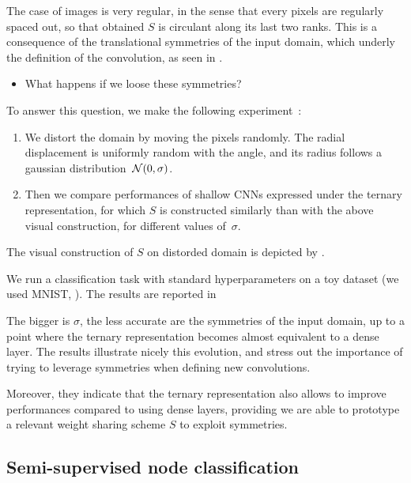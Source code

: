 

The case of images is very regular, in the sense that every pixels are regularly spaced out, so that obtained $S$ is circulant along its last two ranks. This is a consequence of the translational symmetries of the input domain, which underly the definition of the convolution, as seen in .
\begin{itemize}
\item What happens if we loose these symmetries?
\end{itemize}

To answer this question, we make the following experiment~\citep{vialatte2016generalizing}:
\begin{enumerate}
\item We distort the domain by moving the pixels randomly. The radial displacement is uniformly random with the angle, and its radius follows a gaussian distribution~$\mathcal{N}(0,\sigma)$.
\item Then we compare performances of shallow CNNs expressed under the ternary representation, for which $S$ is constructed similarly than with the above visual construction, for different values of~$\sigma$.
\end{enumerate}

The visual construction of $S$ on distorded domain is depicted by .

{}

We run a classification task with standard hyperparameters on a toy dataset (we used MNIST, \cite{lecun1998mnist}). The results are reported in 



The bigger is $\sigma$, the less accurate are the symmetries of the input domain, up to a point where the ternary representation becomes almost equivalent to a dense layer. The results illustrate nicely this evolution, and stress out the importance of trying to leverage symmetries when defining new convolutions.

Moreover, they indicate that the ternary representation also allows to improve performances compared to using dense layers, providing we are able to prototype a relevant weight sharing scheme $S$ to exploit symmetries.

\subsection{Semi-supervised node classification}


